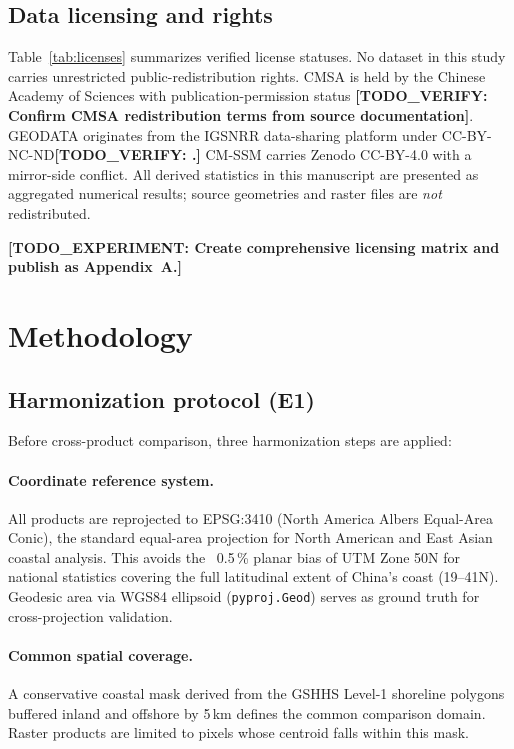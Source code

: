 \documentclass[11pt]{article}
\newcommand{\TODOEXP}[1]{\textcolor{todocolor}{\textbf{[TODO_EXPERIMENT: #1]}}}
\newcommand{\TODOVERIFY}[1]{\textcolor{todocolor}{\textbf{[TODO_VERIFY: #1]}}}
\begin{document}
\subsection{Data licensing and rights}

Table~\ref{tab:licenses} summarizes verified license statuses. No dataset in
this study carries unrestricted public-redistribution rights. CMSA is held by
the Chinese Academy of Sciences with publication-permission status
\TODOVERIFY{Confirm CMSA redistribution terms from source documentation}.
GEODATA originates from the IGSNRR data-sharing platform under
CC-BY-NC-ND\TODOVERIFY. CM-SSM carries Zenodo CC-BY-4.0 with a mirror-side
conflict. All derived statistics in this manuscript are presented as aggregated
numerical results; source geometries and raster files are \emph{not} redistributed.

\TODOEXP{Create comprehensive licensing matrix and publish as Appendix~A.}

\section{Methodology}
\label{sec:methods}

\subsection{Harmonization protocol (E1)}
\label{sec:methods-harm}

Before cross-product comparison, three harmonization steps are applied:

\paragraph{Coordinate reference system.} All products are reprojected to EPSG:3410
(North America Albers Equal-Area Conic), the standard equal-area projection for
North American and East Asian coastal analysis. This avoids the ~0.5\,\% planar
bias of UTM Zone 50N for national statistics covering the full latitudinal
extent of China's coast (19--41\textdegree{}N). Geodesic area via WGS84 ellipsoid
(\texttt{pyproj.Geod}) serves as ground truth for cross-projection validation.

\paragraph{Common spatial coverage.} A conservative coastal mask derived from the
GSHHS Level-1 shoreline polygons\citep{wessel_1996_gshhs} buffered inland and
offshore by 5\,km defines the common comparison domain. Raster products are
limited to pixels whose centroid falls within this mask.
\end{document}
